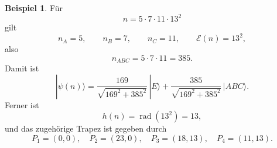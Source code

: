 \documentclass[11pt,a4paper]{article}
\theoremstyle{definition}
\newtheorem{beispiel}{Beispiel}
\DeclareMathOperator{\rad}{rad}
\begin{document}
 	\begin{beispiel}
 		Für
 		\[
 		n=5\cdot 7\cdot 11\cdot 13^2
 		\]
 		gilt
 		\[
 		n_A=5,\qquad n_B=7,\qquad n_C=11,
 		\qquad
 		\mathcal E(n)=13^2,
 		\]
 		also
 		\[
 		n_{ABC}=5\cdot 7\cdot 11=385.
 		\]
 		Damit ist
 		\[
 		|\psi(n)\rangle
 		=
 		\frac{169}{\sqrt{169^2+385^2}}\,|E\rangle
 		+
 		\frac{385}{\sqrt{169^2+385^2}}\,|ABC\rangle.
 		\]
 		Ferner ist
 		\[
 		h(n)=\rad(13^2)=13,
 		\]
 		und das zugehörige Trapez ist gegeben durch
 		\[
 		P_1=(0,0),\quad
 		P_2=(23,0),\quad
 		P_3=(18,13),\quad
 		P_4=(11,13).
 		\]
 	\end{beispiel}
 	
 
\end{document}
